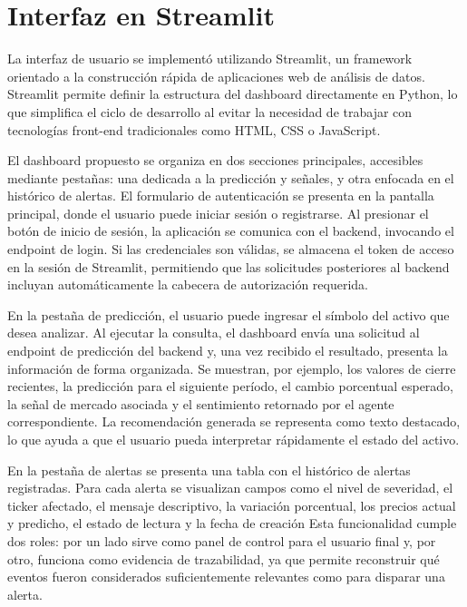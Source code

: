 \section{Interfaz en Streamlit}

La interfaz de usuario se implementó utilizando Streamlit, un framework orientado a la construcción rápida de aplicaciones web de análisis de datos. Streamlit permite definir la estructura del dashboard directamente en Python, lo que simplifica el ciclo de desarrollo al evitar la necesidad de trabajar con tecnologías front-end tradicionales como HTML, CSS o JavaScript.

El dashboard propuesto se organiza en dos secciones principales, accesibles mediante pestañas: una dedicada a la predicción y señales, y otra enfocada en el histórico de alertas. El formulario de autenticación se presenta en la pantalla principal, donde el usuario puede   iniciar sesión o registrarse. Al presionar el botón de inicio de sesión, la aplicación se comunica con el backend, invocando el endpoint de login. Si las credenciales son válidas, se almacena el token de acceso en la sesión de Streamlit, permitiendo que las solicitudes posteriores al backend incluyan automáticamente la cabecera de autorización requerida.

En la pestaña de predicción, el usuario puede ingresar el símbolo del activo que desea analizar. Al ejecutar la consulta, el dashboard envía una solicitud al endpoint de predicción del backend y, una vez recibido el resultado, presenta la información de forma organizada. Se muestran, por ejemplo, los valores de cierre recientes, la predicción para el siguiente período, el cambio porcentual esperado, la señal de mercado asociada y el sentimiento retornado por el agente correspondiente. La recomendación generada se representa como texto destacado, lo que ayuda a que el usuario pueda interpretar rápidamente el estado del activo.

En la pestaña de alertas se presenta una tabla con el histórico de alertas registradas. Para cada alerta se visualizan campos como el nivel de severidad, el ticker afectado, el mensaje descriptivo, la variación porcentual, los  precios actual y predicho, el estado de lectura y la fecha de creación Esta funcionalidad cumple dos roles: por un lado sirve como panel de control para el usuario final y, por otro, funciona como evidencia de trazabilidad, ya que permite reconstruir qué eventos fueron considerados suficientemente relevantes como para disparar una alerta.

